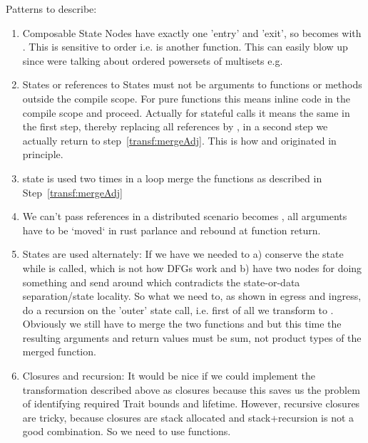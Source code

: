 Patterns to describe:
\begin{enumerate}
    \item\label{transf:mergeAdj} Composable State Nodes have exactly one 'entry' and 'exit', so  
    becomes  with . This is sensitive to order i.e.  is another function. This can easily blow up since were talking about ordered powersets of multisets e.g. 
    \item\label{transf:pullUp} States or references to States must not be arguments to functions or methods outside the compile scope. For pure functions this means inline code in the compile scope and proceed. Actually for stateful calls  it means the same in the first step, thereby replacing all  references by , in a second step we actually return to step~\ref{transf:mergeAdj}. This is how  and  originated in principle.
    \item state is used two times in a loop \means merge the functions as described in Step~\ref{transf:mergeAdj}
    \item\label{transf:remRefs} We can't pass references in a distributed scenario \means {} becomes  , all arguments have to be `moved` in rust parlance and rebound at function return. 
    \item States are used alternately: If we have  we needed to a) conserve the state  while  is called, which is not how DFGs work and b) have two nodes for  doing something and send  around which contradicts the state-or-data separation/state locality. So what we need to, as shown in egress and ingress, do a recursion on the 'outer' state call, i.e. first of all we transform to . Obviously we still have to merge the two functions  and  but this time the resulting arguments and return values must be sum, not product types of the merged function. 
    \item Closures and recursion: It would be nice if we could implement the transformation described above as closures because this saves us the problem of identifying required Trait bounds and lifetime. However, recursive closures are tricky, because closures are stack allocated and stack+recursion is not a good combination. So we need to use functions. 
    

\end{enumerate}
